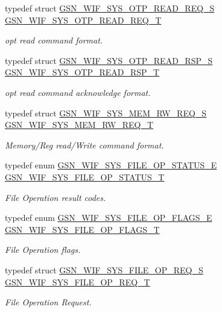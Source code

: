 \begin{DoxyCompactItemize}
typedef struct \hyperlink{a00358}{GSN\_\-WIF\_\-SYS\_\-OTP\_\-READ\_\-REQ\_\-S} \hyperlink{a00639_gab7804e5393f417c861691706760684ef}{GSN\_\-WIF\_\-SYS\_\-OTP\_\-READ\_\-REQ\_\-T}
\begin{DoxyCompactList}\small\item\em opt read command format. \end{DoxyCompactList}\item 
typedef struct \hyperlink{a00359}{GSN\_\-WIF\_\-SYS\_\-OTP\_\-READ\_\-RSP\_\-S} \hyperlink{a00639_gae38db03f3f15f58fb7e7d6bcdc07474a}{GSN\_\-WIF\_\-SYS\_\-OTP\_\-READ\_\-RSP\_\-T}
\begin{DoxyCompactList}\small\item\em opt read command acknowledge format. \end{DoxyCompactList}\item 
typedef struct \hyperlink{a00357}{GSN\_\-WIF\_\-SYS\_\-MEM\_\-RW\_\-REQ\_\-S} \hyperlink{a00639_ga9e7044ea584df3b45c6e9811e5de6731}{GSN\_\-WIF\_\-SYS\_\-MEM\_\-RW\_\-REQ\_\-T}
\begin{DoxyCompactList}\small\item\em Memory/Reg read/Write command format. \end{DoxyCompactList}\item 
typedef enum \hyperlink{a00639_ga4ab9f7b6980d4b5c3f3a0199250b8923}{GSN\_\-WIF\_\-SYS\_\-FILE\_\-OP\_\-STATUS\_\-E} \hyperlink{a00639_gafae04713b42d9bf1e40e2f94397416e3}{GSN\_\-WIF\_\-SYS\_\-FILE\_\-OP\_\-STATUS\_\-T}
\begin{DoxyCompactList}\small\item\em File Operation result codes. \end{DoxyCompactList}\item 
typedef enum \hyperlink{a00639_gac5b276b2a9ea66f27afb0f35e0e75257}{GSN\_\-WIF\_\-SYS\_\-FILE\_\-OP\_\-FLAGS\_\-E} \hyperlink{a00639_ga7719428a1c7dead37acbe115df44fad9}{GSN\_\-WIF\_\-SYS\_\-FILE\_\-OP\_\-FLAGS\_\-T}
\begin{DoxyCompactList}\small\item\em File Operation flags. \end{DoxyCompactList}\item 
typedef struct \hyperlink{a00350}{GSN\_\-WIF\_\-SYS\_\-FILE\_\-OP\_\-REQ\_\-S} \hyperlink{a00639_ga1808a8f4a69150d0761c6d965d5527d0}{GSN\_\-WIF\_\-SYS\_\-FILE\_\-OP\_\-REQ\_\-T}
\begin{DoxyCompactList}\small\item\em File Operation Request. \end{DoxyCompactList}\item 

\end{DoxyCompactItemize}
